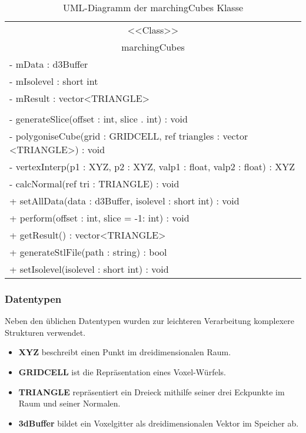 \begin{table}[H]
	\centering
	\caption{UML-Diagramm der marchingCubes Klasse}
	\label{fig:marchingCubes}
	\begin{tabular}{|l|}
		\hline
		\multicolumn{1}{|c|}{<<Class>>} \\
		\multicolumn{1}{|c|}{marchingCubes} \\
		\hline
		- mData : d3Buffer\\
		- mIsolevel : short int\\
		- mResult : vector<TRIANGLE>\\
		\\
		- generateSlice(offset : int, slice . int) : void\\
		- polygoniseCube(grid : GRIDCELL, ref triangles : vector <TRIANGLE>) : void\\
		- vertexInterp(p1 : XYZ, p2 : XYZ, valp1 : float, valp2 : float) : XYZ\\
		- calcNormal(ref tri : TRIANGLE) : void\\
		\hline
		+ setAllData(data : d3Buffer, isolevel : short int) : void\\
		+ perform(offset : int, slice = -1: int) : void\\
		+ getResult() : vector<TRIANGLE>\\
		+ generateStlFile(path : string) : bool\\
		+ setIsolevel(isolevel : short int) : void\\
		\hline
	\end{tabular}
\end{table}

\subsubsection{Datentypen}
Neben den üblichen Datentypen wurden zur leichteren Verarbeitung komplexere Strukturen verwendet.\\
\begin{itemize}
	\item \textbf{XYZ} beschreibt einen Punkt im dreidimensionalen Raum.
	\item \textbf{GRIDCELL} ist die Repräsentation eines Voxel-Würfels. 
	\item \textbf{TRIANGLE} repräsentiert ein Dreieck mithilfe seiner drei Eckpunkte im Raum und seiner Normalen.
	\item \textbf{3dBuffer} bildet ein Voxelgitter als dreidimensionalen Vektor im Speicher ab.
\end{itemize}

